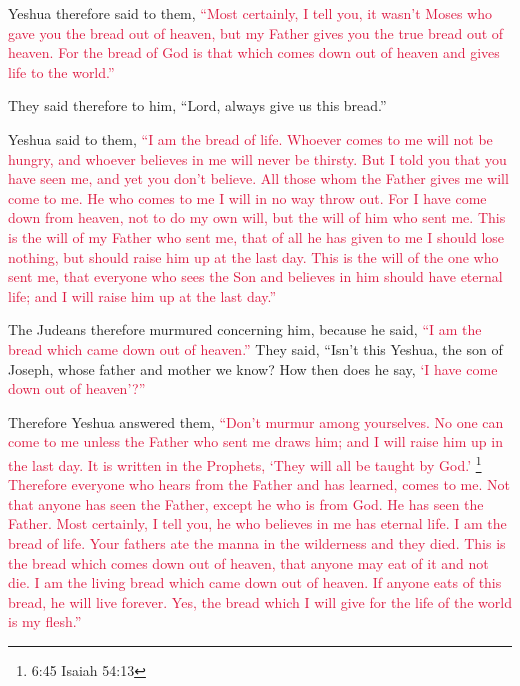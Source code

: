 \myverse{}Yeshua therefore said to them,
\textcolor{crimson}{“Most certainly, I tell you, it wasn’t Moses who gave you the bread out of heaven, but my Father gives
	you the true bread out of heaven.
}
\myverse{}\textcolor{crimson}{For the bread of God is that which comes down out of heaven and gives
	life to the world.”}

\myverse{}They said therefore to him, “Lord, always give us this bread.”

\myverse{}Yeshua said to them,
\textcolor{crimson}{“I am the bread of life. Whoever comes to me will not be hungry, and whoever believes in me will never
	be thirsty.
}
\myverse{}\textcolor{crimson}{But I told you that you have seen me, and yet you don’t believe.
}
\myverse{}\textcolor{crimson}{All those whom the Father gives me will come to me. He who comes to me
	I will in no way throw out.
}
\myverse{}\textcolor{crimson}{For I have come down from heaven, not to do my own will, but the will
	of him who sent me.
}
\myverse{}\textcolor{crimson}{This is the will of my Father who sent me, that of all he has given to
	me I should lose nothing, but should raise him up at the last day.
}
\myverse{}\textcolor{crimson}{This is the will of the one who sent me, that everyone who sees the Son
	and believes in him should have eternal life; and I will raise him up at the last day.”}

\myverse{}The Judeans therefore murmured concerning him, because he said,
\textcolor{crimson}{“I am the bread which came down out of heaven.”}
\myverse{}They said, “Isn’t this Yeshua, the son of Joseph, whose father and mother
we know? How then does he say,
\textcolor{crimson}{‘I have come down out of heaven’?”
}

\myverse{}Therefore Yeshua answered them,
\textcolor{crimson}{“Don’t murmur among yourselves.
}
\myverse{}\textcolor{crimson}{No one can come to me unless the Father who sent me draws him; and I will
	raise him up in the last day.
}
\myverse{}\textcolor{crimson}{It is written in the Prophets, ‘They will all be taught by God.’
}\footnote{6:45 Isaiah 54:13}
\textcolor{crimson}{Therefore everyone who hears from the Father and has learned, comes to me.
}
\myverse{}\textcolor{crimson}{Not that anyone has seen the Father, except he who is from God. He has
	seen the Father.
}
\myverse{}\textcolor{crimson}{Most certainly, I tell you, he who believes in me has eternal life.
}
\myverse{}\textcolor{crimson}{I am the bread of life.
}
\myverse{}\textcolor{crimson}{Your fathers ate the manna in the wilderness and they died.
}
\myverse{}\textcolor{crimson}{This is the bread which comes down out of heaven, that anyone may eat
	of it and not die.
}
\myverse{}\textcolor{crimson}{I am the living bread which came down out of heaven. If anyone eats of
	this bread, he will live forever. Yes, the bread which I will give for the life of the world is my flesh.”}

